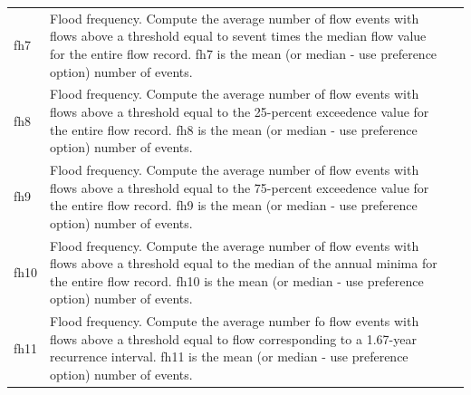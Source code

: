\documentclass[a4paper,11pt]{article}\usepackage[]{graphicx}\usepackage[]{color}
\begin{document}
\begin{table}[ht]
\begin{threeparttable}[b]
\begin{tabularx}{\textwidth}{lXl}
  fh7 & Flood frequency. Compute the average number of flow events with flows above a threshold equal to sevent times the median flow value for the entire flow record. fh7 is the mean (or median - use preference option) number of events. \\
  fh8 & Flood frequency. Compute the average number of flow events with flows above a threshold equal to the 25-percent exceedence value for the entire flow record. fh8 is the mean (or median - use preference option) number of events. \\
  fh9 & Flood frequency. Compute the average number of flow events with flows above a threshold equal to the 75-percent exceedence value for the entire flow record. fh9 is the mean (or median - use preference option) number of events. \\
  fh10 & Flood frequency. Compute the average number of flow events with flows above a threshold equal to the median of the annual minima for the entire flow record. fh10 is the mean (or median - use preference option) number of events. \\
  fh11 & Flood frequency. Compute the average number fo flow events with flows above a threshold equal to flow corresponding to a 1.67-year recurrence interval. fh11 is the mean (or median - use preference option) number of events. \\
   \hline
\end{tabularx}
\end{threeparttable}
\end{table}
\end{document}
